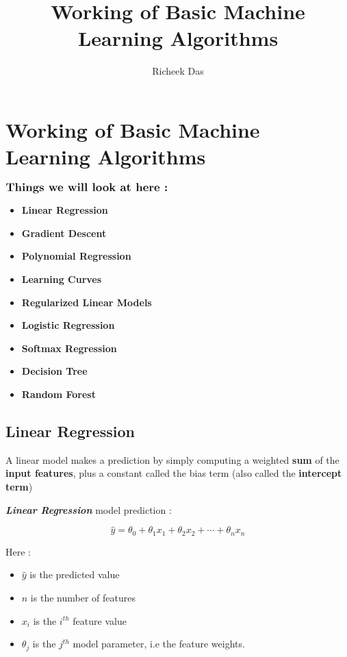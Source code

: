 \documentclass[11pt, a4paper]{book}
\title{Working of Basic Machine Learning Algorithms}
\author{Richeek Das}
\begin{document}
    \setlength{\abovedisplayskip}{3pt}
    \setlength{\belowdisplayskip}{3pt}
    \maketitle
    
\chapter{Working of Basic Machine Learning Algorithms}

    
    \(\large\textbf{Things we will look at here :}\)

\begin{itemize}
\item
  \textbf{Linear Regression}
\item
  \textbf{Gradient Descent}
\item
  \textbf{Polynomial Regression}
\item
  \textbf{Learning Curves}
\item
  \textbf{Regularized Linear Models}
\item
  \textbf{Logistic Regression}
\item
  \textbf{Softmax Regression}
\item
  \textbf{Decision Tree}
\item
  \textbf{Random Forest}
\end{itemize}

    \hypertarget{linear-regression}{%
\section{Linear Regression}\label{linear-regression}}

A linear model makes a prediction by simply computing a weighted
\textbf{sum} of the \textbf{input features}, plus a constant called the
bias term (also called the \textbf{intercept term})

\textbf{\emph{Linear Regression}} model prediction :

\[\hat{y} = \theta_{0} + \theta_{1}x_{1} + \theta_{2}x_{2} + \dotsm + \theta_{n}x_{n}\]

Here :

\begin{itemize}
\item
  \(\hat{y}\) is the predicted value
\item
  \(n\) is the number of features
\item
  \(x_{i}\) is the \(i^{th}\) feature value
\item
  \(\theta_{j}\) is the \(j^{th}\) model parameter, i.e the feature
  weights.
\end{itemize}
\end{document}
